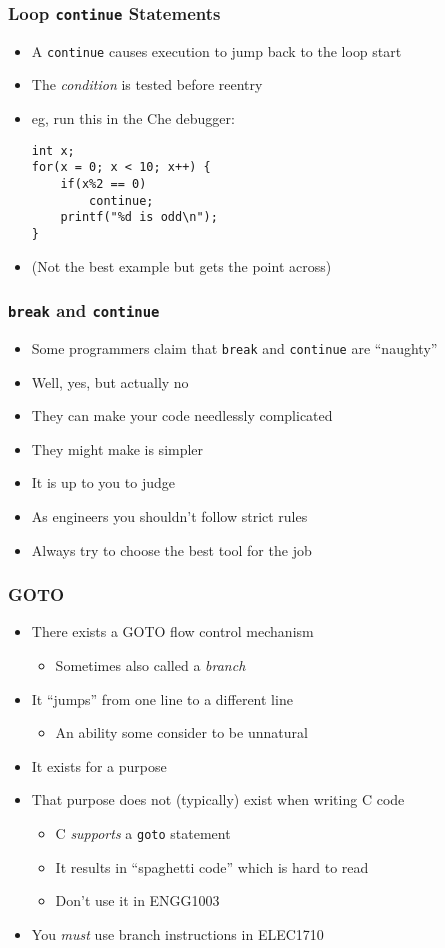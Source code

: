 \documentclass[14pt]{beamer}
\begin{document}
\begin{frame}[fragile]
\frametitle{Loop \texttt{continue} Statements}
\begin{itemize}
	\item A \texttt{continue} causes execution to jump back to the loop start
	\item The \textit{condition} is tested before reentry	
	\item eg, run this in the Che debugger:
	\begin{lstlisting}[style=CStyle]
int x;
for(x = 0; x < 10; x++) {
	if(x%2 == 0)
		continue;
	printf("%d is odd\n");
}
\end{lstlisting}
\item {\small(Not the best example but gets the point across)}
\end{itemize}
\end{frame}

\begin{frame}
\frametitle{\texttt{break} and \texttt{continue}}
\begin{itemize}
\item Some programmers claim that \texttt{break} and \texttt{continue} are ``naughty''
\item Well, yes, but actually no
\item They can make your code needlessly complicated
\item They might make is simpler
\item It is up to you to judge
\item As engineers you shouldn't follow strict rules
\item Always try to choose the best tool for the job
\end{itemize}
\end{frame}

\begin{frame}
\frametitle{GOTO}
\begin{itemize}
\item There exists a GOTO flow control mechanism
	\begin{itemize}
		\item Sometimes also called a \textit{branch}
	\end{itemize}
\item It ``jumps'' from one line to a different line
	\begin{itemize}
		\item An ability some consider to be unnatural
	\end{itemize}
\item It exists for a purpose
\item That purpose does not (typically) exist when writing C code
	\begin{itemize}
		\item C \textit{supports} a \texttt{goto} statement
		\item It results in ``spaghetti code'' which is hard to read
		\item Don't use it in ENGG1003
	\end{itemize}
\item You \textit{must} use branch instructions in ELEC1710
\end{itemize}
\end{frame}
\end{document}
